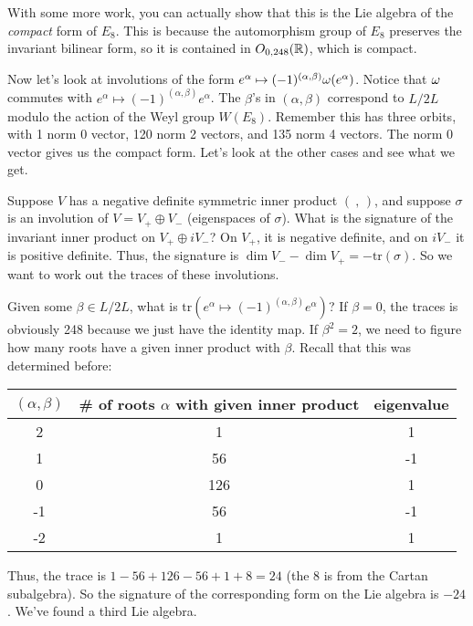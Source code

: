  With some more work, you can actually show that this is the Lie algebra of the
 \emph{compact} form of $E_8$. This is because the automorphism group of $E_8$ preserves the
 invariant bilinear form, so it is contained in $O_{0,248}(\mathbb{R})$, which is compact.

 Now let's look at involutions of the form $e^\alpha\mapsto
 (-1)^{(\alpha,\beta)}\omega(e^\alpha)$. Notice that $\omega$ commutes with $e^\alpha\mapsto
 (-1)^{(\alpha,\beta)}e^\alpha$. The $\beta$'s in $(\alpha,\beta)$ correspond to
 $L/2L$ modulo the action of the Weyl group $W(E_8)$. Remember this has three orbits,
 with 1 norm 0 vector, 120 norm 2 vectors, and 135 norm 4 vectors. The norm 0 vector
 gives us the compact form. Let's look at the other cases and see what we get.

 Suppose $V$ has a negative definite symmetric inner product $(\ ,\,)$, and suppose
 $\sigma$ is an involution of $V=V_+\oplus V_-$ (eigenspaces of $\sigma$). What is the
 signature of the invariant inner product on $V_+\oplus iV_-$? On $V_+$, it is
 negative definite, and on $iV_-$ it is positive definite. Thus, the signature is
 $\dim V_- - \dim V_+= -\mathrm{tr}(\sigma)$. So we want to work out the traces of these
 involutions.

 Given some $\beta \in L/2L$, what is $\mathrm{tr}(e^\alpha\mapsto
 (-1)^{(\alpha,\beta)}e^\alpha)$? If $\beta =0$, the traces is obviously 248 because
 we just have the identity map. If $\beta^2=2$, we need to figure how many roots have
 a given inner product with $\beta$. Recall that this was determined before:
 \begin{center}
 \begin{tabular}{|c|c|c|}
 \hline
 $(\alpha,\beta)$ & \# of roots $\alpha$ with given inner product & eigenvalue\\
 \hline
 2                & 1                                        & 1  \\
 1                & 56                                       & -1 \\
 0                & 126                                      & 1  \\
 -1               & 56                                       & -1 \\
 -2               & 1                                        & 1  \\
 \hline
 \end{tabular}
 \end{center}
 Thus, the trace is $1-56+126-56+1+8=24$ (the $8$
 is from the Cartan subalgebra). So the signature of the corresponding form on the Lie
 algebra is $-24$. We've found a third Lie algebra.

